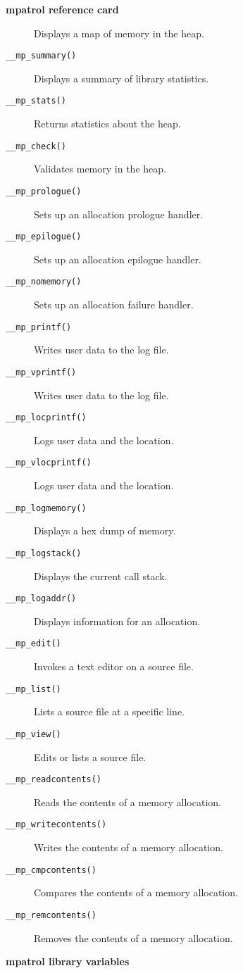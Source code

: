 \documentclass[a4paper,landscape,final]{article}
\newcommand{\heading}[1]{\textbf{\normalsize #1}}
\newcommand{\function}[1]{\texttt{#1()}}
\begin{document}
\begin{multicols}{3}{\textbf{\Large mpatrol reference card}}
\begin{description}
\hfill Displays a map of memory in the heap.
\item[\function{\_\_mp\_summary}]
\hfill Displays a summary of library statistics.
\item[\function{\_\_mp\_stats}]
\hfill Returns statistics about the heap.
\item[\function{\_\_mp\_check}]
\hfill Validates memory in the heap.
\item[\function{\_\_mp\_prologue}]
\hfill Sets up an allocation prologue handler.
\item[\function{\_\_mp\_epilogue}]
\hfill Sets up an allocation epilogue handler.
\item[\function{\_\_mp\_nomemory}]
\hfill Sets up an allocation failure handler.
\item[\function{\_\_mp\_printf}]
\hfill Writes user data to the log file.
\item[\function{\_\_mp\_vprintf}]
\hfill Writes user data to the log file.
\item[\function{\_\_mp\_locprintf}]
\hfill Logs user data and the location.
\item[\function{\_\_mp\_vlocprintf}]
\hfill Logs user data and the location.
\item[\function{\_\_mp\_logmemory}]
\hfill Displays a hex dump of memory.
\item[\function{\_\_mp\_logstack}]
\hfill Displays the current call stack.
\item[\function{\_\_mp\_logaddr}]
\hfill Displays information for an allocation.
\item[\function{\_\_mp\_edit}]
\hfill Invokes a text editor on a source file.
\item[\function{\_\_mp\_list}]
\hfill Lists a source file at a specific line.
\item[\function{\_\_mp\_view}]
\hfill Edits or lists a source file.
\item[\function{\_\_mp\_readcontents}]
\hfill Reads the contents of a memory allocation.
\item[\function{\_\_mp\_writecontents}]
\hfill Writes the contents of a memory allocation.
\item[\function{\_\_mp\_cmpcontents}]
\hfill Compares the contents of a memory allocation.
\item[\function{\_\_mp\_remcontents}]
\hfill Removes the contents of a memory allocation.
\end{description}

\vskip 12pt
\heading{mpatrol library variables}
\vskip 6pt


\end{multicols}
\end{document}
